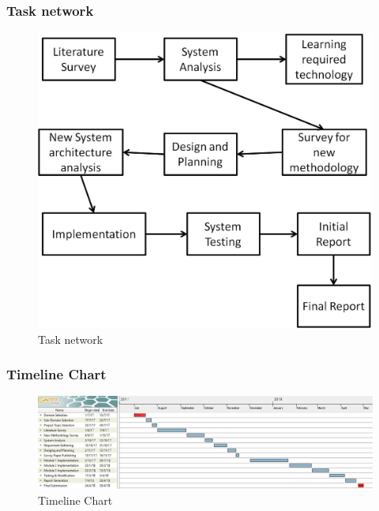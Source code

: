 \documentclass[12pt,a4paper]
{article}
\numberwithin{table}{section}
\begin{document}
{{{{{\subsubsection{Task network}

\begin{center}
	  \begin{figure}[h]
			\centering
			\includegraphics[width=12 cm , height= 6 cm]{TN.jpg}
			\caption{Task network}
		\end{figure}
	\end{center}	
	
	\newpage
	
\subsubsection{Timeline Chart}
\begin{center}
	  \begin{figure}[h]
			\centering
			\includegraphics[width=17 cm , height= 8 cm]{TC.png}
			\caption{Timeline Chart}
		\end{figure}
	\end{center}

\vspace{0.4 in}

}}}}}
\end{document}
